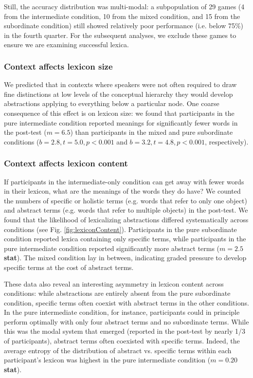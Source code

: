 \documentclass[10pt,letterpaper]{article}
\begin{document}
Still, the accuracy distribution was multi-modal: a subpopulation of 29 games (4 from the intermediate condition, 10 from the mixed condition, and 15 from the subordinate condition) still showed relatively poor  performance (i.e. below 75\%) in the fourth quarter. For the subsequent analyses, we exclude these games to ensure we are examining successful lexica.

\subsubsection{Context affects lexicon size}

We predicted that in contexts where speakers were not often required to draw fine distinctions at low levels of the conceptual hierarchy they would develop abstractions applying to everything below a particular node. One coarse consequence of this effect is on lexicon size: we found that participants in the pure intermediate condition reported meanings for significantly fewer words in the post-test ($m = 6.5$) than participants in the mixed and pure subordinate conditions ($b = 2.8, t = 5.0, p <0.001$ and $b = 3.2, t = 4.8, p < 0.001$, respectively). 

\subsubsection{Context affects lexicon content}

If participants in the intermediate-only condition can get away with fewer words in their lexicon, what are the meanings of the words they do have? We counted the numbers of specific or holistic terms (e.g. words that refer to only one object) and abstract terms (e.g. words that refer to multiple objects) in the post-test. We found that the likelihood of lexicalizing abstractions differed systematically across conditions (see Fig. \ref{fig:lexiconContent}). Participants in the pure subordinate condition reported lexica containing only specific terms, while participants in the pure intermediate condition reported significantly more abstract terms ($m = 2.5$ \textbf{stat}). The mixed condition lay in between, indicating graded pressure to develop specific terms at the cost of abstract terms. 

These data also reveal an interesting asymmetry in lexicon content across conditions: while abstractions are entirely absent from the pure subordinate condition, specific terms often coexist with abstract terms in the other conditions. In the pure intermediate condition, for instance, participants could in principle perform optimally with only four abstract terms and no subordinate terms. While this was the modal system that emerged (reported in the post-test by nearly 1/3 of participants), abstract terms often coexisted with specific terms. Indeed, the average entropy of the distribution of abstract vs. specific terms within each participant's lexicon was highest in the pure intermediate condition ($m = 0.20$ \textbf{stat}). 
\end{document}
